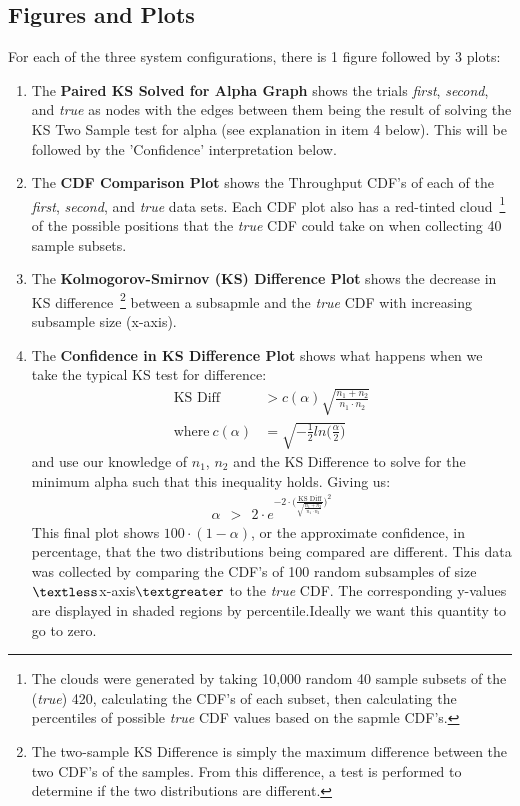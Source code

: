 \documentclass[a4paper,landscape]{article}
\begin{document}
\pagebreak
\subsection*{Figures and Plots}

For each of the three system configurations, there is 1 figure
followed by 3 plots:
\begin{enumerate}
\item The \textbf{Paired KS Solved for Alpha Graph} shows the trials
  \textit{first}, \textit{second}, and \textit{true} as nodes with the
  edges between them being the result of solving the KS Two Sample
  test for alpha (see explanation in item 4 below). This will be
  followed by the 'Confidence' interpretation below.

\item The \textbf{CDF Comparison Plot} shows the Throughput CDF's of
  each of the \textit{first}, \textit{second}, and \textit{true} data
  sets. Each CDF plot also has a red-tinted cloud~\footnote{The clouds
    were generated by taking 10,000 random 40 sample subsets of the
    (\textit{true}) 420, calculating the CDF's of each subset, then
    calculating the percentiles of possible \textit{true} CDF values
    based on the sapmle CDF's.} of the possible positions that the
  \textit{true} CDF could take on when collecting 40 sample subsets.

\item The \textbf{Kolmogorov-Smirnov (KS) Difference Plot} shows the
  decrease in KS difference~\footnote{The two-sample KS Difference is
    simply the maximum difference between the two CDF's of the
    samples. From this difference, a test is performed to determine if
    the two distributions are different.}  between a subsapmle and the
  \textit{true} CDF with increasing subsample size (x-axis).

\item The \textbf{Confidence in KS Difference Plot} shows what happens
  when we take the typical KS test for difference:
  \begin{align*}
    \text{KS Diff} &> c(\alpha) \sqrt{\frac{n_1 + n_2}{n_1 \cdot n_2}}\\
    \text{where}\ c(\alpha) &= \sqrt{-\frac{1}{2}ln\bigg(\frac{\alpha}{2}\bigg)}
  \end{align*}
  and use our knowledge of $n_1$, $n_2$ and the KS Difference to solve
  for the minimum alpha such that this inequality holds. Giving us:
  \begin{align*}
    \alpha\ \  >\ \  2 \cdot e^{-2 \cdot \bigg(\frac{\text{KS Diff}}{\sqrt{\frac{n_1 + n_2}{n_1 \cdot n_2}}}\bigg)^2}
  \end{align*}
  This final plot shows $100 \cdot (1 - \alpha)$, or the approximate
  confidence, in percentage, that the two distributions being compared
  are different. This data was collected by comparing the CDF's of 100
  random subsamples of size $\textless$x-axis$\textgreater$ to the
  \textit{true} CDF. The corresponding y-values are displayed in shaded
  regions by percentile.Ideally we want this quantity to go to zero.

\end{enumerate}
\end{document}
